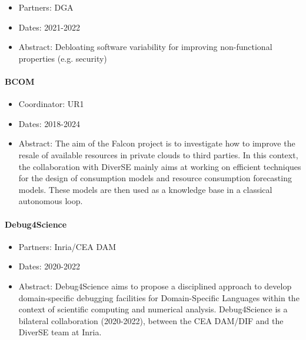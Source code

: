 \begin{participants}
\end{participants}


\begin{itemize}\itemsep0cm
	\item Partners: DGA
	\item Dates: 2021-2022
	\item Abstract: Debloating software variability for improving non-functional properties (e.g. security)
\end{itemize}



\paragraph*{BCOM}

\begin{participants}
\end{participants}



\begin{itemize}\itemsep0cm
	\item Coordinator: UR1
	\item Dates: 2018-2024
	\item Abstract: The aim of the Falcon project is to investigate how to improve the resale of available resources in private clouds to third parties. In this context, the collaboration with DiverSE mainly aims at working on efficient techniques for the design of consumption models and resource consumption forecasting models. These models are then used as a knowledge base in a classical autonomous loop.  
	
\end{itemize}

\paragraph*{Debug4Science}
\begin{participants}
\end{participants}

\begin{itemize}\itemsep0cm
	\item Partners: Inria/CEA DAM
	\item Dates: 2020-2022
	\item Abstract: Debug4Science aims to propose a disciplined approach to develop domain-specific debugging facilities for Domain-Specific Languages within the context of scientific computing and numerical analysis. Debug4Science is a bilateral collaboration (2020-2022), between the CEA DAM/DIF and the DiverSE team at Inria.
\end{itemize}

